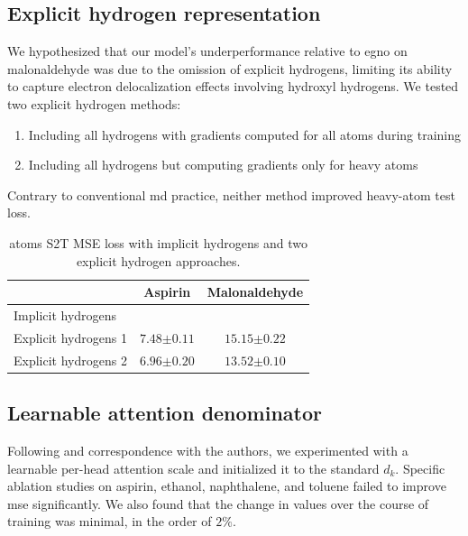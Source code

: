 \subsection{Explicit hydrogen representation}
We hypothesized that our model's underperformance relative to \gls{egno} on malonaldehyde was due to the omission of explicit hydrogens, limiting its ability to capture electron delocalization effects involving hydroxyl hydrogens. We tested two explicit hydrogen methods: 
\begin{enumerate}
    \item Including all hydrogens with gradients computed for all atoms during training
    \item Including all hydrogens but computing gradients only for heavy atoms
\end{enumerate}

Contrary to conventional \gls{md} practice, neither method improved heavy-atom test loss.

\begin{table}[H]
    \centering
    \caption{\gls{atoms} S2T MSE loss with implicit hydrogens and two explicit hydrogen approaches.}
    \label{tab:explicit_hydrogens}
    \begin{tabular}{lcc}
        \toprule
        & Aspirin & Malonaldehyde \\
        \midrule
        Implicit hydrogens &  \\
        Explicit hydrogens 1 & \(7.48{\scriptstyle \pm0.11}\) & \(15.15{\scriptstyle \pm0.22}\) \\
        Explicit hydrogens 2 & \(6.96{\scriptstyle \pm0.20}\) & \(13.52{\scriptstyle \pm0.10}\)\\
        \bottomrule
    \end{tabular}
\end{table}

\subsection{Learnable attention denominator}
Following \textcite{jordan_nanogpt_2025} and correspondence with the authors, we experimented with a learnable per-head attention scale and initialized it to the standard \(d_k\). Specific ablation studies on aspirin, ethanol, naphthalene, and toluene failed to improve \gls{mse} significantly. We also found that the change in values over the course of training was minimal, in the order of \(2\%\).

